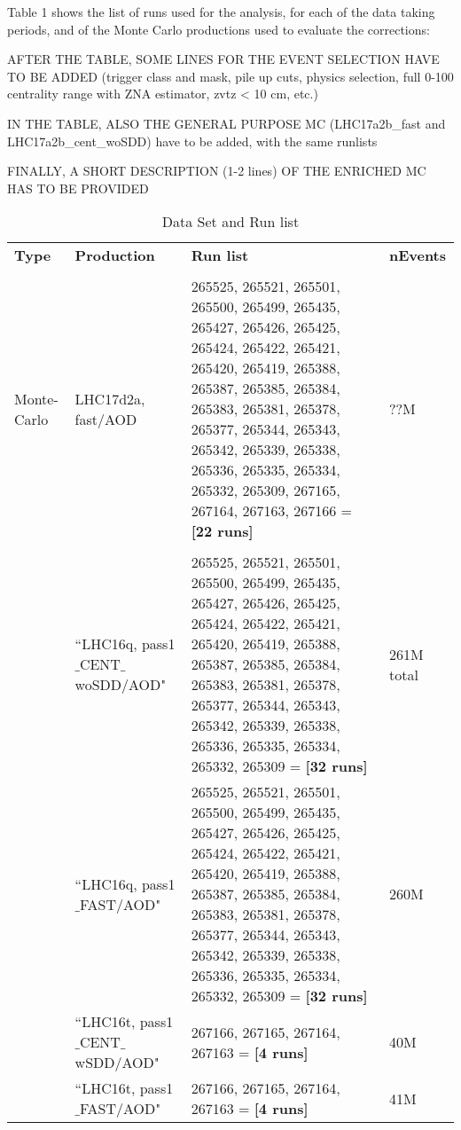 Table 1 shows the list of runs used for the analysis, for each of the data taking periods, and of the Monte Carlo productions used to evaluate the corrections:

AFTER THE TABLE, SOME LINES FOR THE EVENT SELECTION HAVE TO BE ADDED (trigger class and mask, pile up cuts, physics selection, full 0-100 centrality range with ZNA estimator, zvtz < 10 cm, etc.)

IN THE TABLE, ALSO THE GENERAL PURPOSE MC (LHC17a2b_fast and LHC17a2b_cent_woSDD) have to be added, with the same runlists

FINALLY, A SHORT DESCRIPTION (1-2 lines) OF THE ENRICHED MC HAS TO BE PROVIDED

 \vspace{10 mm}

\begin{table}[h]
\begin{tabular}{ p{1.2cm} | p{4.2cm} |  p{7cm} |  p{1.2cm}}
{\normalsize \textbf {Type}} &       {\normalsize \textbf {Production}} &       {\normalsize \textbf {Run list}} & {\normalsize \textbf {nEvents}} \\
\\ \hline
Monte-Carlo & LHC17d2a, fast/AOD &265525, 265521, 265501, 265500, 265499, 265435, 265427, 265426, 265425, 265424, 265422, 265421, 265420, 265419, 265388, 265387, 265385, 265384, 265383, 265381, 265378, 265377, 265344, 265343, 265342, 265339, 265338, 265336, 265335, 265334, 265332, 265309, 267165, 267164, 267163, 267166 = \textbf{[22 runs]} & ??M\\
\\ \hline

\multirow{7}{*}{} Data&``LHC16q, pass1$\_$CENT$\_$woSDD/AOD" & 265525, 265521, 265501, 265500, 265499, 265435, 265427, 265426, 265425, 265424, 265422, 265421, 265420, 265419, 265388, 265387, 265385, 265384, 265383, 265381, 265378, 265377, 265344, 265343, 265342, 265339, 265338, 265336, 265335, 265334, 265332, 265309 = \textbf{[32 runs]}& 261M total\\
                  &``LHC16q, pass1$\_$FAST/AOD" &265525, 265521, 265501, 265500, 265499, 265435, 265427, 265426, 265425, 265424, 265422, 265421, 265420, 265419, 265388, 265387, 265385, 265384, 265383, 265381, 265378, 265377, 265344, 265343, 265342, 265339, 265338, 265336, 265335, 265334, 265332, 265309 = \textbf{[32 runs]} & 260M \\
 & ``LHC16t, pass1$\_$CENT$\_$wSDD/AOD" & 267166, 267165, 267164, 267163 = \textbf{[4 runs]} & 40M \\
  & ``LHC16t, pass1$\_$FAST/AOD" & 267166, 267165, 267164, 267163 = \textbf{[4 runs]} & 41M \\
 \hline \hline
\end{tabular}
\\
\caption {Data Set and Run list}
\end{table} 
